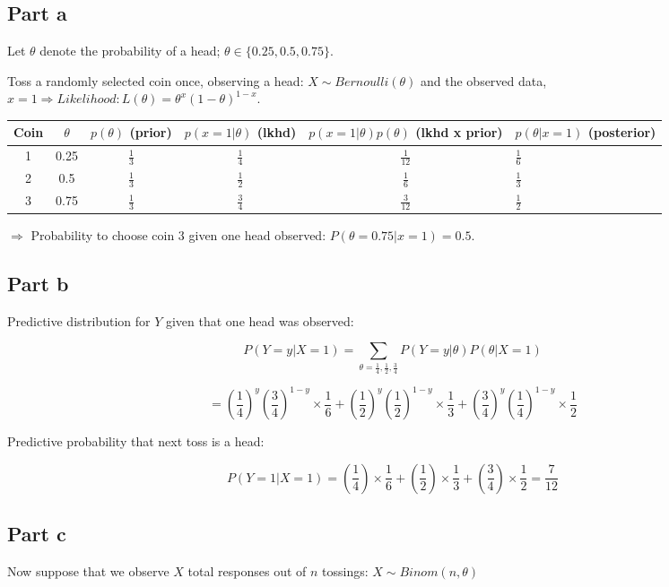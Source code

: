 \documentclass{article}
\begin{document}
\subsection{Part a}
Let $\theta$ denote the probability of a head; $\theta \in \{0.25, 0.5, 0.75\}$.

Toss a randomly selected coin once, observing a head: $X \sim Bernoulli(\theta)$ and the observed data, $x = 1 \Rightarrow Likelihood: L(\theta) = \theta^x(1-\theta)^{1-x}$.

\begin{table}
\begin{tabular}{|c|c|c|c|c|}
\hline
Coin & $\theta$ & $p(\theta)$ (prior) & $p(x=1|\theta)$ (lkhd) & $p(x=1|\theta)p(\theta)$ (lkhd x prior) & $p(\theta|x=1)$ (posterior) \\  & 0.25 & $\frac{1}{3}$ & $\frac{1}{4}$ & $\frac{1}{12}$ & $\frac{1}{6}$ \\  & 0.5 & $\frac{1}{3}$ & $\frac{1}{2}$ & $\frac{1}{6}$ & $\frac{1}{3}$ \\  & 0.75 & $\frac{1}{3}$ & $\frac{3}{4}$ & $\frac{3}{12}$ & $\frac{1}{2}$ \\ \hline
\end{tabular}
\end{table}

$\Rightarrow$ Probability to choose coin 3 given one head observed: $P(\theta=0.75|x=1) = 0.5$.

\subsection{Part b}
Predictive distribution for $Y$ given that one head was observed:

\[
P(Y=y|X=1) = \sum_{\theta=\frac{1}{4},\frac{1}{2},\frac{3}{4}}P(Y=y|\theta)P(\theta|X=1)
\]

\[
= \left(\frac{1}{4}\right)^y\left(\frac{3}{4}\right)^{1-y}\times\frac{1}{6} + \left(\frac{1}{2}\right)^y\left(\frac{1}{2}\right)^{1-y}\times\frac{1}{3} + \left(\frac{3}{4}\right)^y\left(\frac{1}{4}\right)^{1-y}\times\frac{1}{2}
\]

Predictive probability that next toss is a head:

\[
P(Y=1|X=1) = \left(\frac{1}{4}\right)\times\frac{1}{6} + \left(\frac{1}{2}\right)\times\frac{1}{3} + \left(\frac{3}{4}\right)\times\frac{1}{2} = \frac{7}{12}
\]

\subsection{Part c}
Now suppose that we observe $X$ total responses out of $n$ tossings: $X \sim Binom(n, \theta)$
\end{document}
